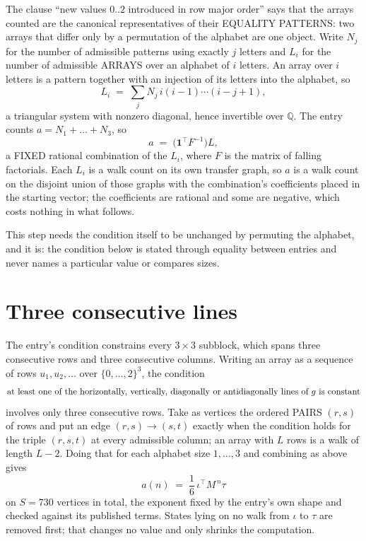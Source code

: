 \documentclass[11pt,a4paper]{article}
\theoremstyle{plain}
\theoremstyle{definition}
\begin{document}
The clause ``new values $0..2$ introduced in row major order'' says that the arrays
counted are the canonical representatives of their EQUALITY PATTERNS: two arrays that differ
only by a permutation of the alphabet are one object. Write $N_j$ for the number of admissible
patterns using exactly $j$ letters and $L_i$ for the number of admissible ARRAYS over an
alphabet of $i$ letters. An array over $i$ letters is a pattern together with an injection of
its letters into the alphabet, so
\[
L_i\;=\;\sum_{j}N_j\,i(i-1)\cdots(i-j+1),
\]
a triangular system with nonzero diagonal, hence invertible over $\mathbb{Q}$. The entry
counts $a=N_1+\dots+N_{3}$, so
\[
a\;=\;\bigl(\mathbf{1}^{\!\top}F^{-1}\bigr)L ,
\]
a FIXED rational combination of the $L_i$, where $F$ is the matrix of falling factorials.
Each $L_i$ is a walk count on its own transfer graph, so $a$ is a walk count on the disjoint
union of those graphs with the combination's coefficients placed in the starting vector; the
coefficients are rational and some are negative, which costs nothing in what follows.

This step needs the condition itself to be unchanged by permuting the alphabet, and it is:
the condition below is stated through equality between entries and never names a particular
value or compares sizes.

\section{Three consecutive lines}

The entry's condition constrains every $3\times3$ subblock, which spans three consecutive
rows and three consecutive columns. Writing an array as a sequence of rows
$u_1,u_2,\dots$ over $\{0,\dots,2\}^{3}$, the condition
\[
\text{at least one}\text{ of the horizontally, vertically, diagonally or antidiagonally lines of }g\text{ \text{is constant}}
\]
involves only three consecutive rows. Take as vertices the ordered PAIRS $(r,s)$ of
rows and put an edge $(r,s)\to(s,t)$ exactly when the condition holds for the triple
$(r,s,t)$ at every admissible column; an array with $L$ rows is a walk of length $L-2$.
Doing that for each alphabet size $1,\dots,3$ and combining as above gives
\[
a(n)\;=\;\frac{1}{6}\,\iota^{\!\top}M^{\,n}\tau
\]
on $S=730$ vertices in total, the exponent fixed by the entry's own shape and checked against
its published terms. States lying on no walk from $\iota$ to $\tau$ are removed first; that
changes no value and only shrinks the computation.
\end{document}

